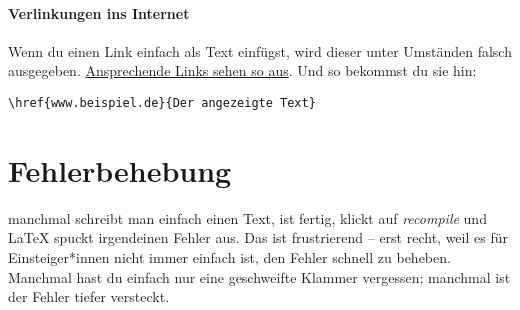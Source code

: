 \paragraph{Verlinkungen ins Internet}
Wenn du einen Link einfach als Text einfügst, wird dieser unter Umständen falsch ausgegeben. \href{www.online-geburtsvorbereitungskurse.de}{Ansprechende Links sehen so aus}. Und so bekommst du sie hin:

\begin{verbatim}
\href{www.beispiel.de}{Der angezeigte Text}
\end{verbatim}


\section{Fehlerbehebung}

manchmal schreibt man einfach einen Text, ist fertig, klickt auf \emph{recompile} und \LaTeX{} spuckt irgendeinen Fehler aus. Das ist frustrierend -- erst recht, weil es für Einsteiger*innen nicht immer einfach ist, den Fehler schnell zu beheben. Manchmal hast du einfach nur eine geschweifte Klammer vergessen; manchmal ist der Fehler tiefer versteckt.

